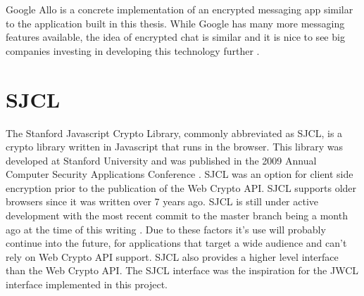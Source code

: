 Google Allo is a concrete implementation of an encrypted messaging app similar to the application built in this thesis. While Google has many more messaging features available, the idea of encrypted chat is similar and it is nice to see big companies investing in developing this technology further \cite{google-allo}.


\section{SJCL}


The Stanford Javascript Crypto Library, commonly abbreviated as SJCL, is a crypto library written in Javascript that runs in the browser. This library was developed at Stanford University and was published in the 2009 Annual Computer Security Applications Conference \cite{sjcl-paper}. SJCL was an option for client side encryption prior to the publication of the Web Crypto API. SJCL supports older browsers since it was written over 7 years ago. SJCL is still under active development with the most recent commit to the master branch being a month ago at the time of this writing \cite{sjcl-library}. Due to these factors it's use will probably continue into the future, for applications that target a wide audience and can't rely on Web Crypto API support. SJCL also provides a higher level interface than the Web Crypto API. The SJCL interface was the inspiration for the JWCL interface implemented in this project.

